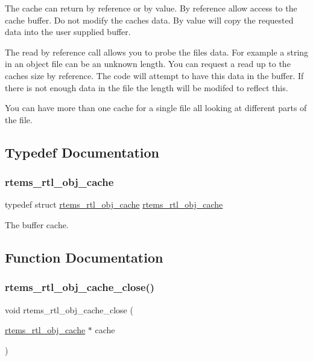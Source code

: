 The cache can return by reference or by value. By reference allow access to the cache buffer. Do not modify the cache\textquotesingle{}s data. By value will copy the requested data into the user supplied buffer.

The read by reference call allows you to probe the file\textquotesingle{}s data. For example a string in an object file can be an unknown length. You can request a read up to the cache\textquotesingle{}s size by reference. The code will attempt to have this data in the buffer. If there is not enough data in the file the length will be modifed to reflect this.

You can have more than one cache for a single file all looking at different parts of the file. 

\subsection{Typedef Documentation}
\mbox{\label{rtl-obj-cache_8h_a81e975e0a01c847123f0c3ed0245c88f}} 
\subsubsection{\texorpdfstring{rtems\_rtl\_obj\_cache}{rtems\_rtl\_obj\_cache}}
{\footnotesize\ttfamily typedef struct \mbox{\hyperlink{structrtems__rtl__obj__cache}{rtems\+\_\+rtl\+\_\+obj\+\_\+cache}}  \mbox{\hyperlink{structrtems__rtl__obj__cache}{rtems\+\_\+rtl\+\_\+obj\+\_\+cache}}}

The buffer cache. 

\subsection{Function Documentation}
\mbox{\label{rtl-obj-cache_8h_af823408cc02aeceb7ab687c7d818ad1a}} 
\subsubsection{\texorpdfstring{rtems\_rtl\_obj\_cache\_close()}{rtems\_rtl\_obj\_cache\_close()}}
{\footnotesize\ttfamily void rtems\+\_\+rtl\+\_\+obj\+\_\+cache\+\_\+close (\begin{DoxyParamCaption}\item[{\mbox{\hyperlink{structrtems__rtl__obj__cache}{rtems\+\_\+rtl\+\_\+obj\+\_\+cache}} $\ast$}]{cache }\end{DoxyParamCaption})}

